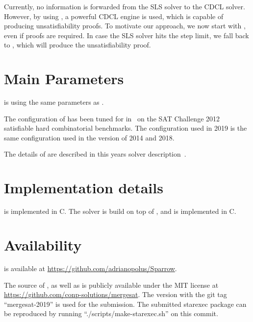 \documentclass[conference]{IEEEtran}
\def\CC{{C\nolinebreak[4]\hspace{-.05em}\raisebox{.4ex}{\tiny\bf ++}}}
\begin{document}
Currently, no information is forwarded from the SLS solver to the CDCL solver.
However, by using \mergesat, a powerful CDCL engine is used, which is capable of producing unsatisfiability proofs.
To motivate our approach, we now start with \scp, even if proofs are required. In case the SLS solver hits the step limit, we fall back to \mergesat, which will produce the unsatisfiability proof.

\section{Main Parameters}
\sparrow is using the same parameters as . 

The configuration of \cpt has been tuned for \sparrow in~\cite{bm-pos-2013} on the SAT Challenge 2012 satisfiable hard combinatorial benchmarks.
The configuration used in 2019 is the same configuration used in the version of 2014 and 2018.

The details of \mergesat are described in this years solver description~\cite{mergesat2019}.

% 
\section{Implementation details}

\sparrow is implemented in C.
%
The solver \mergesat is build on top of \minisat, and is implemented in \CC.
 
\section{Availability}

\sparrow is available at \url{https://github.com/adrianopolus/Sparrow}.

The source of \mergesat, as well as \stm is publicly available under the MIT license at \url{https://github.com/conp-solutions/mergesat}.
The version with the git tag ``mergesat-2019'' is used for the submission.
The submitted starexec package can be reproduced by running ``./scripts/make-starexec.sh'' on this commit.



\end{document}
